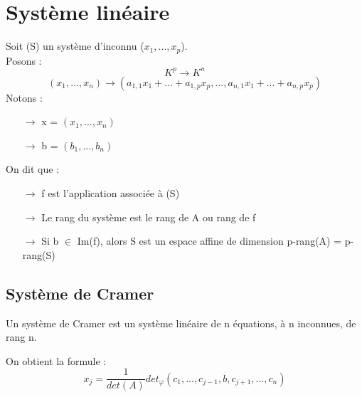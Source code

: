 \section{Système linéaire}
\begin{de}
Soit (S) un système d'inconnu ($x_1,...,x_p$).\\
Posons :
$$K^p \rightarrow K^n$$
$$(x_1,...,x_n) \rightarrow (a_{1,1}x_1+...+a_{1,p}x_p,...,a_{n,1}x_1+...+a_{n,p}x_p)$$
Notons : 
\begin{itemize}
 \item[$\rightarrow$] x = $(x_1,...,x_n)$
 \item[$\rightarrow$] b = $(b_1,...,b_n)$
\end{itemize}
On dit que :
\begin{itemize}
 \item[$\rightarrow$] f est l'application associée à (S)
 \item[$\rightarrow$] Le rang du système est le rang de A ou rang de f
 \item[$\rightarrow$] Si b $\in$ Im(f), alors S est un espace affine de dimension p-rang(A) = p-rang(S)
\end{itemize}
\end{de}
\subsection{Système de Cramer}
\begin{de}
Un système de Cramer est un système linéaire de n équations, à n inconnues, de rang n.
\end{de}
On obtient la formule :
$$x_j = \dfrac{1}{det(A)}det_{\varphi}(c_1,...,c_{j-1},b,c_{j+1},...,c_n)$$
